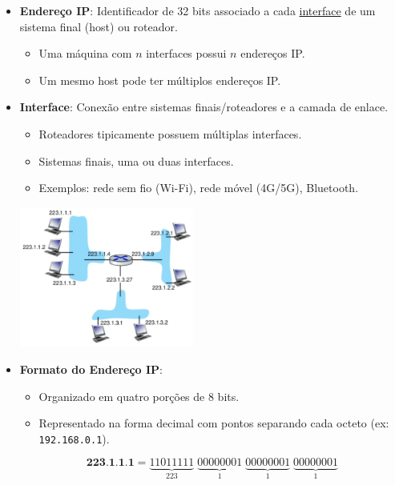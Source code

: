             \begin{itemize}[left=0.5cm, align=left, nosep]
                \item \textbf{Endereço IP}: Identificador de 32 bits associado a cada \underline{interface} de um sistema final (host) ou roteador.  
                \begin{itemize}[left=0.5cm, nosep, label=$\hookrightarrow$]
                    \item Uma máquina com \(n\) interfaces possui \(n\) endereços IP.
                    \item Um mesmo host pode ter múltiplos endereços IP.
                \end{itemize}

                \item \textbf{Interface}: Conexão entre sistemas finais/roteadores e a camada de enlace.  
                \begin{itemize}[left=0.5cm, nosep, label=$\hookrightarrow$]
                    \item Roteadores tipicamente possuem múltiplas interfaces.
                    \item Sistemas finais, uma ou duas interfaces.
                    \item Exemplos: rede sem fio (Wi-Fi), rede móvel (4G/5G), Bluetooth.
                \end{itemize}

                \begin{center}
                    \includegraphics[width=0.45\textwidth]{img/cap-04/introducao-endereco-ip.png}
                \end{center}

                \item \textbf{Formato do Endereço IP}:  
                \begin{itemize}[left=0.5cm, nosep, label=$\hookrightarrow$]
                    \item Organizado em quatro porções de 8 bits.
                    \item Representado na forma decimal com pontos separando cada octeto (ex: \texttt{192.168.0.1}).
                \end{itemize}

                \[
                    \textbf{223.1.1.1}
                    =
                    \underbrace{11011111}_{223} \;
                    \underbrace{00000001}_{1} \;
                    \underbrace{00000001}_{1} \;
                    \underbrace{00000001}_{1}
                \]
            
            \end{itemize}

